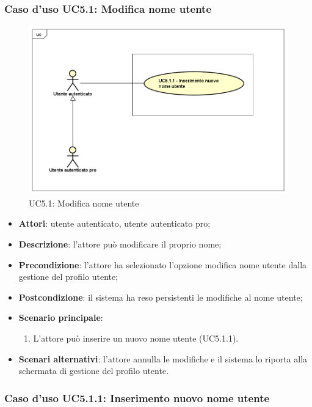 \subsubsection{Caso d'uso UC5.1: Modifica nome utente}
\label{UC5.1}
\begin{figure}
	\centering
	\includegraphics[scale=0.48]{UML/UC5_1.png}
	\caption{UC5.1: Modifica nome utente}
\end{figure}
\begin{itemize}
	\item \textbf{Attori}: utente autenticato, utente autenticato pro;
	\item \textbf{Descrizione}: l'attore può modificare il proprio nome;
	\item \textbf{Precondizione}: l'attore ha selezionato l'opzione modifica nome utente dalla gestione del profilo utente;
	\item \textbf{Postcondizione}: il sistema ha reso persistenti le modifiche al nome utente;
	\item \textbf{Scenario principale}:
		\begin{enumerate}
			\item L'attore può inserire un nuovo nome utente (UC5.1.1).
		\end{enumerate}
	\item \textbf{Scenari alternativi}: l'attore annulla le modifiche e il sistema lo riporta alla schermata di gestione del profilo utente.
\end{itemize}

\subsubsection{Caso d'uso UC5.1.1: Inserimento nuovo nome utente}

